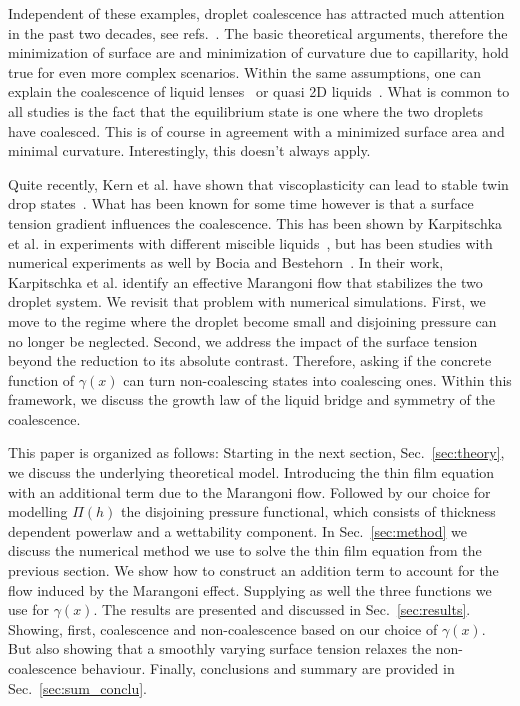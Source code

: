 \documentclass[twocolumn,amsmath,amssymb,showpacs,pre,nofootinbib,superscriptaddress]{revtex4-1} %
\begin{document}
Independent of these examples, droplet coalescence has attracted much attention in the past two decades, see refs.~\cite{eggers_lister_stone_1999, duchemin_eggers_josserand_2003, PhysRevLett.95.164503, PhysRevLett.106.114501, doi:10.1063/1.4828721}. 
The basic theoretical arguments, therefore the minimization of surface are and minimization of curvature due to capillarity, hold true for even more complex scenarios. 
Within the same assumptions, one can explain the coalescence of liquid lenses~\cite{PhysRevLett.124.194502} or quasi 2D liquids~\cite{klopp2020self, doi:10.1021/acs.langmuir.0c02139}.
What is common to all studies is the fact that the equilibrium state is one where the two droplets have coalesced.
This is of course in agreement with a minimized surface area and minimal curvature.
Interestingly, this doesn't always apply.

Quite recently, Kern et al. have shown that viscoplasticity can lead to stable twin drop states~\cite{https://doi.org/10.48550/arxiv.2203.15617}.
What has been known for some time however is that a surface tension gradient influences the coalescence. 
This has been shown by Karpitschka et al. in experiments with different miscible liquids~\cite{PhysRevLett.109.066103, doi:10.1021/la500459v, karpitschka2014sharp, bruning2018delayed}, but has been studies with numerical experiments as well by Bocia and Bestehorn~\cite{PhysRevE.82.036312, borcia2011coalescence}.
In their work, Karpitschka et al. identify an effective Marangoni flow that stabilizes the two droplet system.
We revisit that problem with numerical simulations.
First, we move to the regime where the droplet become small and disjoining pressure can no longer be neglected.
Second, we address the impact of the surface tension beyond the reduction to its absolute contrast.
Therefore, asking if the concrete function of $\gamma(x)$ can turn non-coalescing states into coalescing ones.
Within this framework, we discuss the growth law of the liquid bridge and symmetry of the coalescence.

This paper is organized as follows:
Starting in the next section, Sec.~\ref{sec:theory}, we discuss the underlying theoretical model.
Introducing the thin film equation with an additional term due to the Marangoni flow. 
Followed by our choice for modelling $\Pi(h)$ the disjoining pressure functional, which consists of thickness dependent powerlaw and a wettability component. 
In Sec.~\ref{sec:method} we discuss the numerical method we use to solve the thin film equation from the previous section.
We show how to construct an addition term to account for the flow induced by the Marangoni effect.
Supplying as well the three functions we use for $\gamma(x)$. 
The results are presented and discussed in Sec.~\ref{sec:results}.
Showing, first, coalescence and non-coalescence based on our choice of $\gamma(x)$.
But also showing that a smoothly varying surface tension relaxes the non-coalescence behaviour.
Finally, conclusions and summary are provided in Sec.~\ref{sec:sum_conclu}. 
\end{document}
